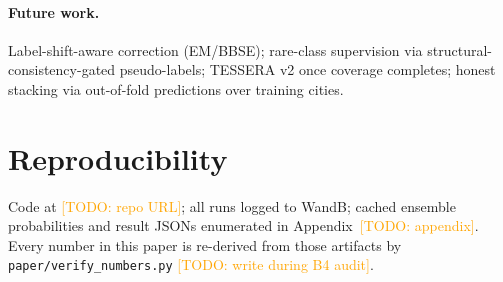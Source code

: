 \documentclass[11pt]{article}
\newcommand{\todo}[1]{\textcolor{orange}{[TODO: #1]}}
\begin{document}
\paragraph{Future work.} Label-shift-aware correction (EM/BBSE);
rare-class supervision via structural-consistency-gated
pseudo-labels; TESSERA v2 once coverage completes; honest stacking
via out-of-fold predictions over training cities.

\section*{Reproducibility}
Code at \todo{repo URL}; all runs logged to WandB; cached ensemble
probabilities and result JSONs enumerated in
Appendix~\todo{appendix}. Every number in this paper is re-derived
from those artifacts by \texttt{paper/verify\_numbers.py}
\todo{write during B4 audit}.



\end{document}
